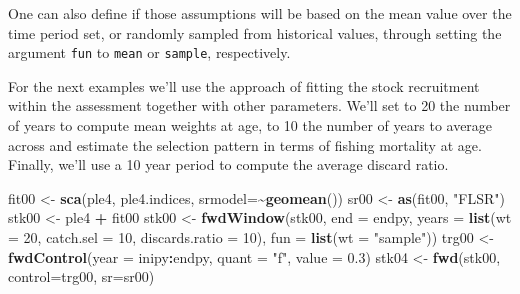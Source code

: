 \documentclass[
]{book}
\newenvironment{Shaded}{\begin{snugshade}}{\end{snugshade}}
\newcommand{\AttributeTok}[1]{\textcolor[rgb]{0.13,0.29,0.53}{#1}}
\newcommand{\DecValTok}[1]{\textcolor[rgb]{0.00,0.00,0.81}{#1}}
\newcommand{\FloatTok}[1]{\textcolor[rgb]{0.00,0.00,0.81}{#1}}
\newcommand{\FunctionTok}[1]{\textcolor[rgb]{0.13,0.29,0.53}{\textbf{#1}}}
\newcommand{\NormalTok}[1]{#1}
\newcommand{\OtherTok}[1]{\textcolor[rgb]{0.56,0.35,0.01}{#1}}
\newcommand{\SpecialCharTok}[1]{\textcolor[rgb]{0.81,0.36,0.00}{\textbf{#1}}}
\newcommand{\StringTok}[1]{\textcolor[rgb]{0.31,0.60,0.02}{#1}}
\begin{document}
One can also define if those assumptions will be based on the mean value over the time period set, or randomly sampled from historical values, through setting the argument \texttt{fun} to \texttt{mean} or \texttt{sample}, respectively.

For the next examples we'll use the approach of fitting the stock recruitment within the assessment together with other parameters. We'll set to 20 the number of years to compute mean weights at age, to 10 the number of years to average across and estimate the selection pattern in terms of fishing mortality at age. Finally, we'll use a 10 year period to compute the average discard ratio.

\begin{Shaded}
\begin{Highlighting}[]
\NormalTok{fit00 }\OtherTok{\textless{}{-}} \FunctionTok{sca}\NormalTok{(ple4, ple4.indices, }\AttributeTok{srmodel=}\SpecialCharTok{\textasciitilde{}}\FunctionTok{geomean}\NormalTok{()) }
\NormalTok{sr00 }\OtherTok{\textless{}{-}} \FunctionTok{as}\NormalTok{(fit00, }\StringTok{"FLSR"}\NormalTok{)}
\NormalTok{stk00 }\OtherTok{\textless{}{-}}\NormalTok{ ple4 }\SpecialCharTok{+}\NormalTok{ fit00}
\NormalTok{stk00 }\OtherTok{\textless{}{-}} \FunctionTok{fwdWindow}\NormalTok{(stk00, }\AttributeTok{end =}\NormalTok{ endpy, }\AttributeTok{years =} \FunctionTok{list}\NormalTok{(}\AttributeTok{wt =} \DecValTok{20}\NormalTok{, }\AttributeTok{catch.sel =} \DecValTok{10}\NormalTok{, }\AttributeTok{discards.ratio =} \DecValTok{10}\NormalTok{), }\AttributeTok{fun =} \FunctionTok{list}\NormalTok{(}\AttributeTok{wt =} \StringTok{"sample"}\NormalTok{))}
\NormalTok{trg00 }\OtherTok{\textless{}{-}} \FunctionTok{fwdControl}\NormalTok{(}\AttributeTok{year =}\NormalTok{ inipy}\SpecialCharTok{:}\NormalTok{endpy, }\AttributeTok{quant =} \StringTok{"f"}\NormalTok{, }\AttributeTok{value =} \FloatTok{0.3}\NormalTok{)}
\NormalTok{stk04 }\OtherTok{\textless{}{-}} \FunctionTok{fwd}\NormalTok{(stk00, }\AttributeTok{control=}\NormalTok{trg00, }\AttributeTok{sr=}\NormalTok{sr00)}
\end{Highlighting}
\end{Shaded}
\end{document}
